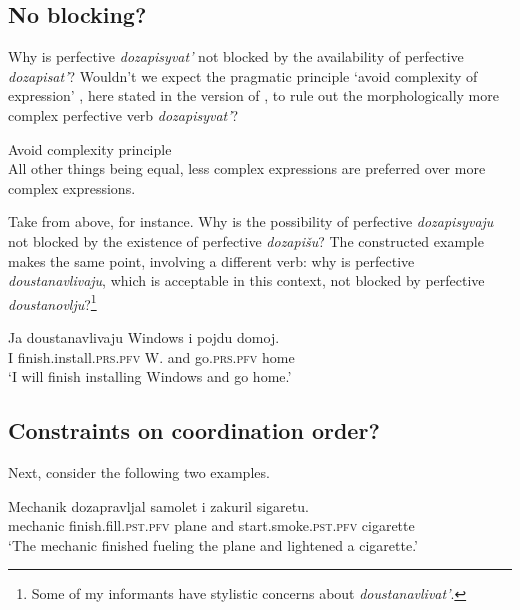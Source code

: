 \documentclass[output=paper,
colorlinks,
citecolor=brown,
newtxmath
]{langscibook}
\begin{document}

\subsection{No blocking?}

Why is perfective \textit{dozapisyvat'} not blocked by the availability of perfective \textit{dozapisat'}? Wouldn't we expect the pragmatic principle `avoid complexity of expression' \citep{Kiparsky2005}, here stated in the version of \citet{LeBruyn2007}, to rule out the morphologically more complex perfective verb \textit{dozapisyvat'}?

\ea\label{avoid} Avoid complexity principle\\All other things being equal, less complex expressions are preferred over more complex expressions.
\z

\noindent Take  from above, for instance. Why is the possibility of perfective \textit{dozapisyvaju} not blocked by the existence of perfective \textit{dozapišu}? The constructed example  makes the same point, involving a different verb: why is perfective \textit{doustanavlivaju}, which is acceptable in this context, not blocked by perfective \textit{doustanovlju}?\footnote{\label{f1}Some of my informants have stylistic concerns about \textit{doustanavlivat'}.}

\ea\label{block1}
\gll Ja doustanavlivaju Windows i pojdu domoj.\\
I {finish.install.}\textsc{prs.pfv} W. and go.\textsc{prs.pfv} home\\
\glt `I will finish installing Windows and go home.'
\z


\subsection{Constraints on coordination order?}\label{arte}

Next, consider the following two examples.

    \largerpage[-1] %

\ea\label{machanik}
\gll Mechanik dozapravljal samolet i zakuril sigaretu.\\
mechanic {finish.fill.}\textsc{pst.pfv} plane and {start.smoke.}\textsc{pst.pfv} cigarette\\
\glt `The mechanic finished fueling the plane and lightened a cigarette.' \\ \hfill \citep[175]{Zinova2016}
\z
\end{document}
